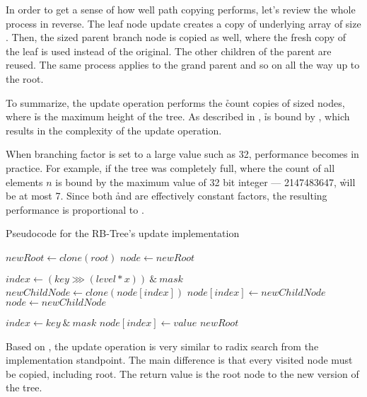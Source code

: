 In order to get a sense of how well path copying performs, let’s review the whole process in reverse. The leaf node update creates a copy of underlying array of size \m. Then, the \m sized parent branch node is copied as well, where the fresh copy of the leaf is used instead of the original. The other children of the parent are reused. The same process applies to the grand parent and so on all the way up to the root.  

To summarize, the update operation performs the \h count copies of \m sized nodes, where \h is the maximum height of the tree. As described in , \h is bound by , which results in the {} complexity of the update operation. 

When branching factor \m is set to a large value such as 32, performance becomes  in practice. For example, if the tree was completely full, where the count of all elements $n$ is bound by the maximum value of 32 bit integer —  2147483647, \h will be at most 7. Since both \h and \m are effectively constant factors, the resulting performance is proportional to . 

\begin{listing}[ht!]        
    \caption{Pseudocode for the RB-Tree's update implementation}
    \label{lst:rb-tree-update}
    
    \begin{algorithmic}
            \State $newRoot \leftarrow clone(root)$
            \State $node \leftarrow newRoot$
    
                \State $index \leftarrow (key \ggg (level * x))\ \&\ mask$
                \State $newChildNode \leftarrow clone(node[index])$
                \State $node[index] \leftarrow newChildNode$
                \State $node \leftarrow newChildNode$
            \EndFor
    
            \State $index \leftarrow key\ \&\ mask$
            \State $node[index] \leftarrow value$            
            \State \Return $newRoot$
        \EndFunction
    \end{algorithmic}
\end{listing}

Based on , the update operation is very similar to radix search from the implementation standpoint. The main difference is that every visited node must be copied, including root. The return value is the root node to the new version of the tree. 


